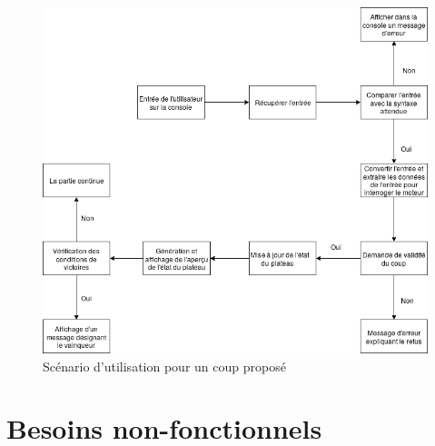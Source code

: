 \documentclass[a4paper]{report}
\begin{document}
\begin{figure}[h]
\centering
\includegraphics[width=1\textwidth]{scenario}
\caption{Scénario d'utilisation pour un coup proposé}
\label{fig:scenario1}
\end{figure}

\section{Besoins non-fonctionnels}
\end{document}
